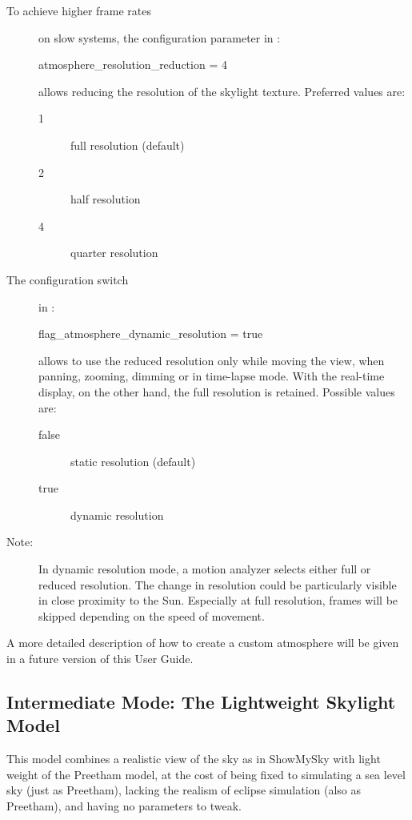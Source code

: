 \begin{description}
\item[To achieve higher frame rates] on slow systems,
the configuration parameter in :
\begin{configfile}
[landscape]
atmosphere_resolution_reduction = 4
\end{configfile}
allows reducing the resolution of the skylight texture.
Preferred values are:
\begin{description}
\item[1] full resolution (default)
\item[2] half resolution
\item[4] quarter resolution
\end{description}
\item[The configuration switch] in :
\begin{configfile}
[landscape]
flag_atmosphere_dynamic_resolution = true
\end{configfile}
allows to use the reduced resolution only while moving the view, when panning, 
zooming, dimming or in time-lapse mode. With the real-time display, on the other hand, 
the full resolution is retained.
Possible values are:
\begin{description}
\item[false] static resolution (default)
\item[true] dynamic resolution
\end{description}
\item[Note:]
In dynamic resolution mode, a motion analyzer selects either full or reduced resolution.
The change in resolution could be particularly visible in close proximity to the Sun.
Especially at full resolution, frames will be skipped depending on the speed of movement.
\end{description}

\noindent A more detailed description of how to create a custom atmosphere will
be given in a future version of this User Guide.

\subsection{Intermediate Mode: The Lightweight Skylight Model}

This model  combines a realistic view of the sky as in ShowMySky with light weight of the Preetham model, at the cost of being fixed to simulating a sea level sky (just as Preetham), lacking the realism of eclipse simulation (also as Preetham), and having no parameters to tweak.

